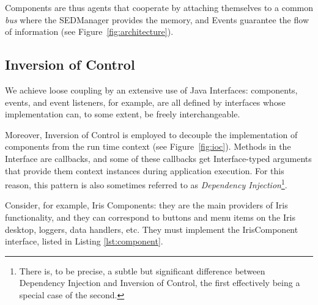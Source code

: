 \documentclass[preprint,authoryear,5p]{elsarticle}
\begin{document}
Components are thus agents that cooperate by attaching themselves to a common
\emph{bus} where the SEDManager provides the memory, and Events guarantee the
flow of information (see Figure~\ref{fig:architecture}).

\subsection{Inversion of Control}

We achieve loose coupling by an extensive use of Java Interfaces: components,
events, and event listeners, for example, are all defined by interfaces whose
implementation can, to some extent, be freely interchangeable.

Moreover, Inversion of Control is employed to decouple
the implementation of components from the run time context (see Figure~\ref{fig:ioc}). 
Methods in the
Interface are callbacks, and some of these callbacks get Interface-typed
arguments that provide them context instances during application execution.
For this reason, this pattern is also sometimes referred to as \emph{Dependency
Injection}\footnote{There is, to be precise, a subtle but significant difference
between Dependency Injection and Inversion of Control, the first effectively
being a special case of the second.}.

Consider, for example, Iris Components: they are the main providers of Iris
functionality, and they can correspond to buttons and menu items on the Iris
desktop, loggers, data handlers, etc. They must implement the IrisComponent
interface, listed in Listing \ref{lst:component}.
\end{document}
